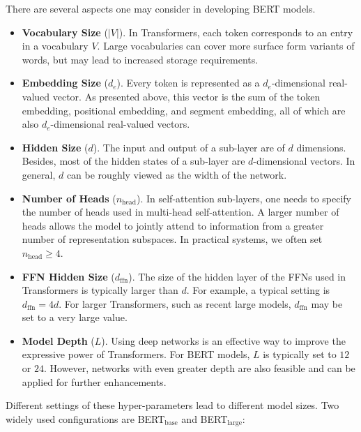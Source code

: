 There are several aspects one may consider in developing BERT models.

\begin{itemize}
\item \vspace{0.5em} \textbf{Vocabulary Size} ($|V|$). In Transformers, each token corresponds to an entry in a vocabulary $V$. Large vocabularies can cover more surface form variants of words, but may lead to increased storage requirements.
\item \vspace{0.3em} \textbf{Embedding Size} ($d_e$). Every token is represented as a $d_e$-dimensional real-valued vector. As presented above, this vector is the sum of the token embedding, positional embedding, and segment embedding, all of which are also $d_e$-dimensional real-valued vectors.
\item \vspace{0.3em} \textbf{Hidden Size} ($d$). The input and output of a sub-layer are of $d$ dimensions. Besides, most of the hidden states of a sub-layer are $d$-dimensional vectors. In general, $d$ can be roughly viewed as the width of the network.
\item \vspace{0.3em} \textbf{Number of Heads} ($n_{\mathrm{head}}$). In self-attention sub-layers, one needs to specify the number of heads used in multi-head self-attention. A larger number of heads allows the model to jointly attend to information from a greater number of representation subspaces. In practical systems, we often set $n_{\mathrm{head}} \ge 4$.
\item \vspace{0.3em} \textbf{FFN Hidden Size} ($d_{\textrm{ffn}}$). The size of the hidden layer of the FFNs used in Transformers is typically larger than $d$. For example, a typical setting is $d_{\textrm{ffn}} = 4 d$. For larger Transformers, such as recent large models, $d_{\textrm{ffn}}$ may be set to a very large value.
\item \vspace{0.3em} \textbf{Model Depth} ($L$). Using deep networks is an effective way to improve the expressive power of Transformers. For BERT models, $L$ is typically set to $12$ or $24$. However, networks with even greater depth are also feasible and can be applied for further enhancements.
\end{itemize}
\vspace{0.5em}

Different settings of these hyper-parameters lead to different model sizes. Two widely used configurations are BERT$_{\mathrm{base}}$ and BERT$_{\mathrm{large}}$:

